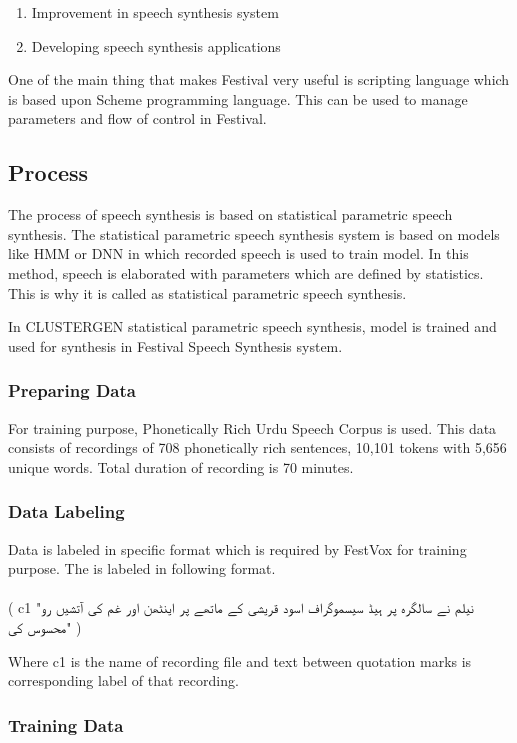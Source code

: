 \begin{itemize}
\begin{enumerate}
  \item Improvement in speech synthesis system
  \item Developing speech synthesis applications
\end{enumerate}

One of the main thing that makes Festival very useful is scripting language which is based upon Scheme programming language. This can be used to manage parameters and flow of  control in Festival. 

\subsection{Process}

The process of speech synthesis is based on statistical parametric speech synthesis. The statistical parametric speech synthesis system is based on models like HMM or DNN in which recorded speech is used to train model. In this method, speech is elaborated with parameters which are defined by statistics. This is why it is called as statistical parametric speech synthesis. 

In CLUSTERGEN statistical parametric speech synthesis, model is trained and used for synthesis in Festival Speech Synthesis system. 

\subsubsection{Preparing Data}

For training purpose, Phonetically Rich Urdu Speech Corpus \cite{urdu_corpus} is used. This data consists of recordings of 708 phonetically rich sentences, 
10,101 tokens with 5,656 unique words. Total duration of recording is 70 minutes.

\subsubsection{Data Labeling}
Data is labeled in specific format which is required by FestVox for training purpose. The is labeled in following format.
\\ \\
( c1 "\texturdu{نیلم نے سالگرہ پر ہیڈ سیسموگراف اسود قریشی کے ماتھے پر اینٹھن اور غم کی آتشیں رو محسوس کی}" )

Where c1 is the name of recording file and text between quotation marks is corresponding label of that recording.

\subsubsection{Training Data}


\end{itemize}
